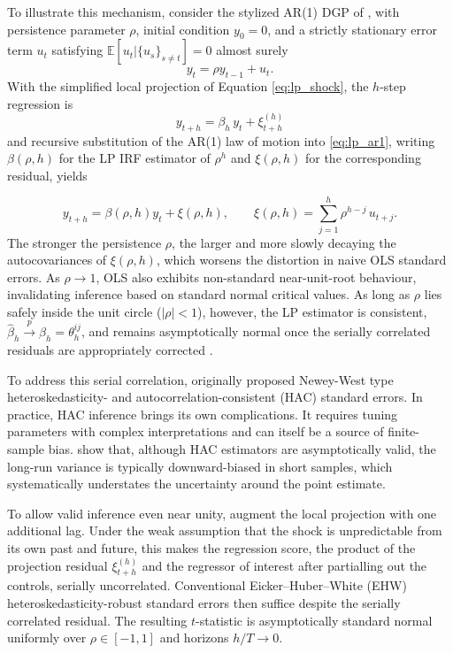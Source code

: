 To illustrate this mechanism, consider the stylized AR(1) DGP of \textcite{jorda2025local}, with
persistence parameter $\rho$, initial condition $y_0 = 0$, and a strictly stationary error term
$u_t$ satisfying $\mathbb{E}[u_t|\{u_s\}_{s\neq t}] = 0$ almost surely
%
\begin{equation}
    y_t = \rho y_{t-1} + u_t.
\end{equation}
%
With the simplified local projection of Equation \eqref{eq:lp_shock}, the $h$-step regression is
%
\begin{equation}
    y_{t+h} = \beta_h\, y_t + \xi_{t+h}^{(h)}
    \label{eq:lp_ar1}
\end{equation}
%
and recursive substitution of the AR(1) law of motion into \eqref{eq:lp_ar1}, writing
$\beta(\rho, h)$ for the LP IRF estimator of $\rho^h$ and $\xi(\rho, h)$ for the corresponding
residual, yields

\begin{equation}
    y_{t+h} = \beta(\rho, h) y_t + \xi(\rho, h) , \qquad \xi(\rho, h) = \sum_{j=1}^{h} \rho^{h-j}\, u_{t+j}.
    \label{eq:ar1_recursive}
\end{equation}
%
The stronger the persistence $\rho$, the larger and more slowly decaying the autocovariances of
$\xi(\rho, h)$, which worsens the distortion in naive OLS standard errors. As $\rho \to 1$, OLS
also exhibits non-standard near-unit-root behaviour, invalidating inference based on standard
normal critical values. As long as $\rho$ lies safely inside the unit circle ($|\rho| < 1$),
however, the LP estimator is consistent, $\hat{\beta}_h \xrightarrow{p} \beta_h = \theta_h^{ij}$,
and remains asymptotically normal once the serially correlated residuals are appropriately
corrected \parencite{montiel2021local,jorda2025local}.

To address this serial correlation, \textcite{jorda2005estimation} originally proposed Newey-West
type \parencite{newey1987simple} heteroskedasticity- and autocorrelation-consistent (HAC) standard
errors. In practice, HAC inference brings its own complications. It requires tuning parameters with
complex interpretations \parencite{lazarus2018har} and can itself be a source of finite-sample
bias. \textcite{herbst2024bias} show that, although HAC estimators are asymptotically valid, the
long-run variance is typically downward-biased in short samples, which systematically understates
the uncertainty around the point estimate.

To allow valid inference even near unity, \textcite{montiel2021local} augment the local projection
with one additional lag. Under the weak assumption that the shock is unpredictable from its own past
and future, this makes the regression score, the product of the projection residual
$\xi^{(h)}_{t+h}$ and the regressor of interest after partialling out the controls, serially
uncorrelated. Conventional Eicker--Huber--White (EHW) heteroskedasticity-robust standard errors then
suffice despite the serially correlated residual. The resulting $t$-statistic is asymptotically
standard normal uniformly over $\rho \in [-1,1]$ and horizons $h/T \to 0$.

